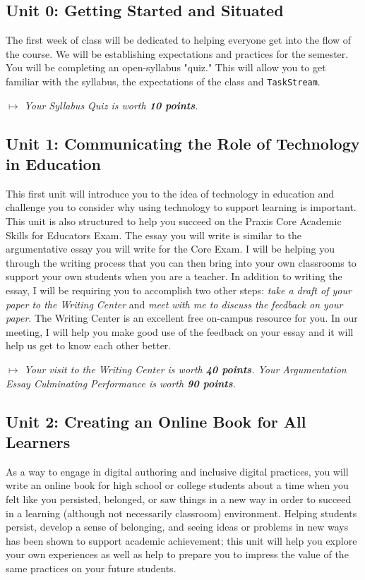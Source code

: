 \documentclass{tufte-handout}
\begin{document}
\subsection{Unit 0: Getting Started and Situated}

The first week of class will be dedicated to helping everyone get into the flow of the course. We will be establishing expectations and practices for the semester. You will be completing an open-syllabus "quiz." This will allow you to get familiar with the syllabus, the expectations of the class and \texttt{TaskStream}.

\medskip\noindent\textit{$\mapsto$ Your Syllabus Quiz is worth \textbf{10 points}.}


\subsection{Unit 1: Communicating the Role of Technology in Education}

This first unit will introduce you to the idea of technology in education and challenge you to consider why using technology to support learning is important. This unit is also structured to help you succeed on the Praxis Core Academic Skills for Educators Exam. The essay you will write is similar to the argumentative essay you will write for the Core Exam. I will be helping you through the writing process that you can then bring into your own classrooms to support your own students when you are a teacher. In addition to writing the essay, I will be requiring you to accomplish two other steps: \textit{take a draft of your paper to the Writing Center} and \textit{meet with me to discuss the feedback on your paper}. The Writing Center is an excellent free on-campus resource for you. In our meeting, I will help you make good use of the feedback on your essay and it will help us get to know each other better.

\medskip\noindent\textit{$\mapsto$ Your visit to the Writing Center is worth \textbf{40 points}. Your Argumentation Essay Culminating Performance is worth \textbf{90 points}.}

\subsection{Unit 2: Creating an Online Book for All Learners}

As a way to engage in digital authoring and inclusive digital practices, you will write an online book for high school or college students about a time when you felt like you persisted, belonged, or saw things in a new way in order to succeed in a learning (although not necessarily classroom) environment. Helping students persist, develop a sense of belonging, and seeing ideas or problems in new ways has been shown to support academic achievement; this unit will help you explore your own experiences as well as help to prepare you to impress the value of the same practices on your future students.
\end{document}
